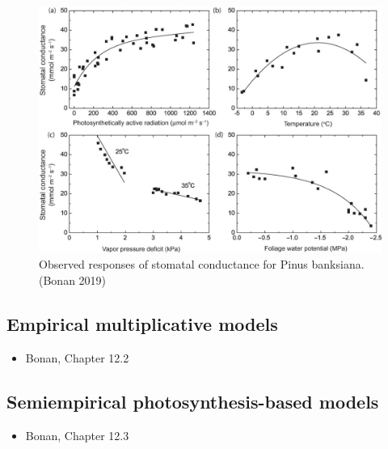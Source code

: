 \documentclass[12pt,oneside]{book}
\providecommand{\tightlist}{%
  \setlength{\itemsep}{0pt}\setlength{\parskip}{0pt}}
\begin{document}
\begin{figure}

{\centering \includegraphics[width=0.8\linewidth]{figures/chap2/gs_obs} 

}

\caption{Observed responses of stomatal conductance for Pinus banksiana. (Bonan 2019)}\label{fig:f212}
\end{figure}

\subsection{Empirical multiplicative
models}\label{empirical-multiplicative-models}

\begin{itemize}
\tightlist
\item
  Bonan, Chapter 12.2
\end{itemize}

\subsection{Semiempirical photosynthesis-based
models}\label{semiempirical-photosynthesis-based-models}

\begin{itemize}
\tightlist
\item
  Bonan, Chapter 12.3
\end{itemize}
\end{document}
